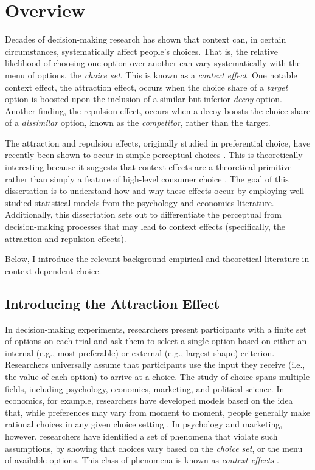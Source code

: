 \section{Overview}

Decades of decision-making research has shown that context can, in certain circumstances, systematically affect people's choices. That is, the relative likelihood of choosing one option over another can vary systematically with the menu of options, the \textit{choice set}. This is known as a \textit{context effect}. One notable context effect, the attraction effect, occurs when the choice share of a \textit{target} option is boosted upon the inclusion of a similar but inferior \textit{decoy} option. Another finding, the repulsion effect, occurs when a decoy boosts the choice share of a \textit{dissimilar} option, known as the \textit{competitor}, rather than the target.

The attraction and repulsion effects, originally studied in preferential choice, have recently been shown to occur in simple perceptual choices \parencite{trueblood2013not,spektorWhenGoodLooks2018b,liaoInfluenceDistanceDecoy2021,spektorRepulsionEffectPreferential2022,evansImpactPresentationOrder2021}. This is theoretically interesting because it suggests that context effects are a theoretical primitive rather than simply a feature of high-level consumer choice \parencite{trueblood2013not}. The goal of this dissertation is to understand how and why these effects occur by employing well-studied statistical models from the psychology and economics literature. Additionally, this dissertation sets out to differentiate the perceptual from decision-making processes that may lead to context effects (specifically, the attraction and repulsion effects).

Below, I introduce the relevant background empirical and theoretical literature in context-dependent choice. 

\subsection{Introducing the Attraction Effect}

In decision-making experiments, researchers present participants with a finite set of options on each trial and ask them to select a single option based on either an internal (e.g., most preferable) or external (e.g., largest shape) criterion. Researchers universally assume that participants use the input they receive (i.e., the value of each option) to arrive at a choice. The study of choice spans multiple fields, including psychology, economics, marketing, and political science. In economics, for example, researchers have developed models based on the idea that, while preferences may vary from moment to moment, people generally make rational choices in any given choice setting \parencite{mcfadden2001economic}. In psychology and marketing, however, researchers have identified a set of phenomena that violate such assumptions, by showing that choices vary based on the \textit{choice set}, or the menu of available options. This class of phenomena is known as \textit{context effects} \parencite{adler2024forty}.

